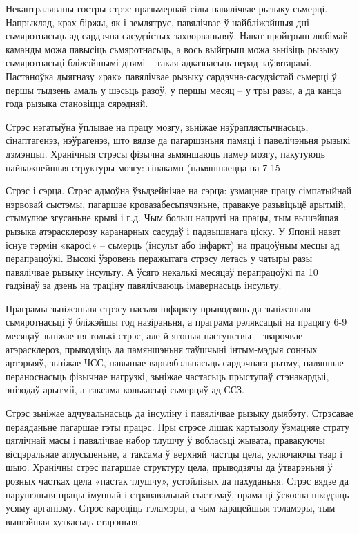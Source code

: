 Некантраляваны гостры стрэс празьмернай сілы павялічвае рызыку сьмерці. Напрыклад, крах біржы, як і землятрус, павялічвае ў найбліжэйшыя дні сьмяротнасьць ад сардэчна-сасудзістых захворваньняў. Нават пройгрыш любімай каманды можа павысіць сьмяротнасьць, а вось выйгрыш можа зьнізіць рызыку сьмяротнасьці бліжэйшымі днямі – такая адказнасьць перад заўзятарамі. Пастаноўка дыягназу «рак» павялічвае рызыку сардэчна-сасудзістай сьмерці ў першы тыдзень амаль у шэсьць разоў, у першы месяц – у тры разы, а да канца года рызыка становіцца сярэдняй.

Стрэс нэгатыўна ўплывае на працу мозгу, зьніжае нэўраплястычнасьць, сінаптагенэз, нэўрагенэз, што вядзе да пагаршэньня памяці і павелічэньня рызыкі дэмэнцыі. Хранічныя стрэсы фізычна зьмяншаюць памер мозгу, пакутуюць найважнейшыя структуры мозгу: гіпакамп (памяншаецца на 7-15%

Стрэс і сэрца. Стрэс адмоўна ўзьдзейнічае на сэрца: узмацняе працу сімпатыйнай нэрвовай сыстэмы, пагаршае кровазабесьпячэньне, правакуе разьвіцьцё арытмій, стымулюе згусаньне крыві і г.д. Чым больш напругі на працы, тым вышэйшая рызыка атэрасклерозу каранарных сасудаў і падвышанага ціску. У Японіі нават існуе тэрмін «каросі» – сьмерць (інсульт або інфаркт) на працоўным месцы ад перапрацоўкі. Высокі ўзровень перажытага стрэсу летась у чатыры разы павялічвае рызыку інсульту. А ўсяго некалькі месяцаў перапрацоўкі па 10 гадзінаў за дзень на траціну павялічваюць імавернасьць інсульту.

Праграмы зьніжэньня стрэсу пасьля інфаркту прыводзяць да зьніжэньня сьмяротнасьці ў бліжэйшы год назіраньня, а праграма рэляксацыі на працягу 6-9 месяцаў зьніжае ня толькі стрэс, але й ягоныя наступствы – зварочвае атэрасклероз, прыводзіць да памяншэньня таўшчыні інтым-мэдыя сонных артэрыяў, зьніжае ЧСС, павышае варыябэльнасьць сардэчнага рытму, паляпшае пераноснасьць фізычнае нагрузкі, зьніжае частасьць прыступаў стэнакардыі, эпізодаў арытміі, а таксама колькасьці сьмерцяў ад ССЗ.

Стрэс зьніжае адчувальнасьць да інсуліну і павялічвае рызыку дыябэту. Стрэсавае пераяданьне пагаршае гэты працэс. Пры стрэсе лішак картызолу ўзмацняе страту цяглічнай масы і павялічвае набор тлушчу ў вобласьці жывата, правакуючы вісцэральнае атлусьценьне, а таксама ў верхняй частцы цела, уключаючы твар і шыю. Хранічны стрэс пагаршае структуру цела, прыводзячы да ўтварэньня ў розных частках цела «пастак тлушчу», устойлівых да пахуданьня. Стрэс вядзе да парушэньня працы імуннай і стрававальнай сыстэмаў, прама ці ўскосна шкодзіць усяму арганізму. Стрэс кароціць тэламэры, а чым карацейшыя тэламэры, тым вышэйшая хуткасьць старэньня.

